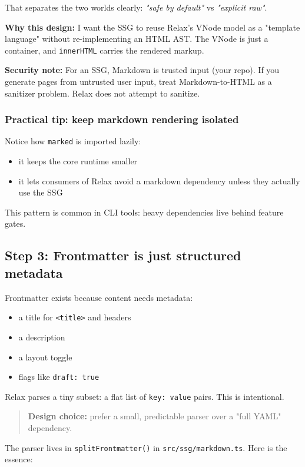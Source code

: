 That separates the two worlds clearly: \emph{"safe by default"} vs \emph{"explicit raw"}.

\textbf{Why this design:}
I want the SSG to reuse Relax's VNode model as a "template language" without re-implementing an HTML AST.
The VNode is just a container, and \texttt{innerHTML} carries the rendered markup.

\textbf{Security note:}
For an SSG, Markdown is trusted input (your repo).
If you generate pages from untrusted user input, treat Markdown-to-HTML as a sanitizer problem.
Relax does not attempt to sanitize.

\subsubsection{Practical tip: keep markdown rendering isolated}
Notice how \texttt{marked} is imported lazily:

\begin{itemize}
  \item it keeps the core runtime smaller
  \item it lets consumers of Relax avoid a markdown dependency unless they actually use the SSG
\end{itemize}

This pattern is common in CLI tools: heavy dependencies live behind feature gates.

\subsection{Step 3: Frontmatter is just structured metadata}
Frontmatter exists because content needs metadata:

\begin{itemize}
  \item a title for \texttt{<title>} and headers
  \item a description
  \item a layout toggle
  \item flags like \texttt{draft: true}
\end{itemize}

Relax parses a tiny subset: a flat list of \texttt{key: value} pairs.
This is intentional.

\begin{quote}
\textbf{Design choice:} prefer a small, predictable parser over a "full YAML" dependency.
\end{quote}

The parser lives in \texttt{splitFrontmatter()} in \texttt{src/ssg/markdown.ts}.
Here is the essence:

